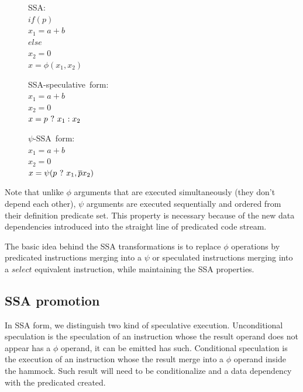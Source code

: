 \begin{figure}
\begin{minipage}[t]{3.5cm}
\mbox{SSA:} \\
$ if (p) $ \\
$   x_1 = a+b $ \\
$ else $ \\
$   x_2 = 0 $ \\
$ x = \phi (x_1, x_2) $ \\
\end{minipage}
\begin{minipage}[t]{3.5cm}
\mbox{SSA-speculative form:} \\
$x_1 = a + b $ \\
$x_2 = 0 $ \\
$x = p ~?~  x_1 : x_2$ \\
\end{minipage}
\begin{minipage}[t]{3.5cm}
\mbox{$\psi$-SSA form:} \\
$x_1 = a + b $ \\
$x_2 = 0 $\\
$x = \psi (p ~?~ x_1, \overline{p} x_2) $ \\
\end{minipage}
\end{figure}

Note that unlike $\phi$ arguments that are executed simultaneously (they don't depend each other), $\psi$ arguments are executed sequentially and ordered from their definition predicate set. This property is necessary because of the new data dependencies introduced into the straight line of predicated code stream.

The basic idea behind the SSA transformations is to replace $\phi$ operations by predicated instructions merging into a $\psi$ or speculated instructions merging into a $select$ equivalent instruction, while maintaining the SSA properties.

\subsection{SSA promotion}

In SSA form, we distinguish two kind of speculative execution. Unconditional speculation is the speculation of an instruction whose the result operand does not appear has a $\phi$ operand, it can be emitted has such. Conditional speculation is the execution of an instruction whose the result merge into a $\phi$ operand inside the hammock. Such result will need to be conditionalize and a data dependency with the predicated created.

